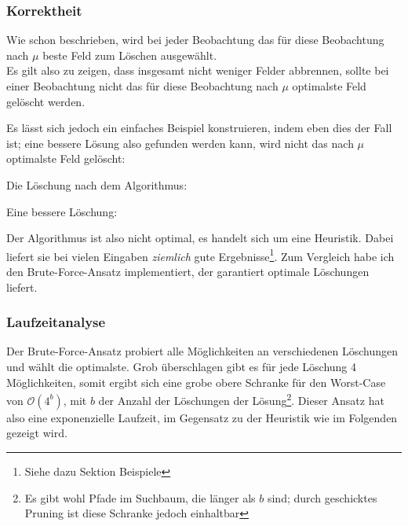 \subsubsection{Korrektheit}
Wie schon beschrieben, wird bei jeder Beobachtung das für diese Beobachtung nach $\mu$ beste Feld zum Löschen ausgewählt.\\
Es gilt also zu zeigen, dass insgesamt nicht weniger Felder abbrennen, sollte bei einer Beobachtung nicht das für diese Beobachtung nach $\mu$ optimalste Feld gelöscht werden. 

Es lässt sich jedoch ein einfaches Beispiel konstruieren, indem eben dies der Fall ist; eine bessere Lösung also gefunden werden kann, wird nicht das nach $\mu$ optimalste Feld gelöscht:

\begin{multicols}{2}
Die Löschung nach dem Algorithmus:
{\ttfamily \small

}

Eine bessere Löschung:
{\ttfamily \small

}
\end{multicols}

Der Algorithmus ist also nicht optimal, es handelt sich um eine Heuristik. Dabei liefert sie bei vielen Eingaben \emph{ziemlich} gute Ergebnisse\footnote{Siehe dazu Sektion Beispiele}. Zum Vergleich habe ich den Brute-Force-Ansatz implementiert, der garantiert optimale Löschungen liefert. 

\subsubsection{Laufzeitanalyse}
Der Brute-Force-Ansatz probiert alle Möglichkeiten an verschiedenen Löschungen und wählt die optimalste. Grob überschlagen gibt es für jede Löschung 4 Möglichkeiten, somit ergibt sich eine grobe obere Schranke für den Worst-Case von $\mathcal{O}(4^b)$, mit $b$ der Anzahl der Löschungen der Lösung\footnote{Es gibt wohl Pfade im Suchbaum, die länger als $b$ sind; durch geschicktes Pruning ist diese Schranke jedoch einhaltbar}. Dieser Ansatz hat also eine exponenzielle Laufzeit, im Gegensatz zu der Heuristik wie im Folgenden gezeigt wird.

